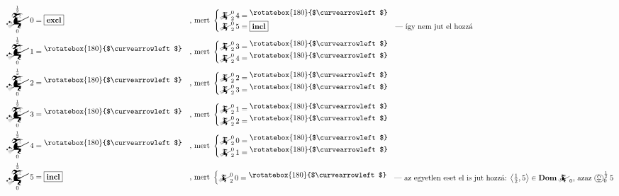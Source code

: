 \documentclass{article}
\newcommand{\nothing}{\text{\raisebox{0.4em}{\rotatebox{180}{$\curvearrowleft$}}}}%
\newcommand{\just}[1]{\boxed{#1}}%
\DeclareMathOperator{\dom}{\mathbf{Dom}}
\newcommand{\incl}{\mathbf{incl}}
\newcommand{\excl}{\mathbf{excl}}
\newcommand{\angled}[1]{\left\langle#1\right\rangle}
\newcommand{\mainfun}[3]{\mathwitch_{#1}^{#2}#3}
\newcommand{\yesmainfun}[3]{\bigpumpkin_{#1}^{#2}#3}
\newcommand{\currymainfun}[1]{\mathwitch_{#1}}
\begin{document}
	\begin{align*}
		\mainfun0{\frac12}0  &= \just \excl &&\text{, mert }\begin{cases}\mainfun2{0}4 = \nothing\\\mainfun2{0}5 = \just \incl&\text{--- így nem jut el hozzá}\end{cases} \\
		\mainfun0{\frac12}1  &= \nothing    &&\text{, mert }\begin{cases}\mainfun2{0}3 = \nothing\\\mainfun2{0}4 = \nothing&\end{cases} \\
		\mainfun0{\frac12}2  &= \nothing    &&\text{, mert }\begin{cases}\mainfun2{0}2 = \nothing\\\mainfun2{0}3 = \nothing&\end{cases} \\
		\mainfun0{\frac12}3  &= \nothing    &&\text{, mert }\begin{cases}\mainfun2{0}1 = \nothing\\\mainfun2{0}2 = \nothing&\end{cases} \\
		\mainfun0{\frac12}4  &= \nothing    &&\text{, mert }\begin{cases}\mainfun2{0}0 = \nothing\\\mainfun2{0}1 = \nothing&\end{cases} \\
		\mainfun0{\frac12}5  &= \just \incl &&\text{, mert }\begin{cases}\mainfun2{0}0 = \nothing&\text{--- az egyetlen eset el is jut hozzá: $\angled{\frac12,5}\in\dom\currymainfun0$, azaz $\yesmainfun0{\frac12}5$}\end{cases}
	\end{align*}
\end{document}
